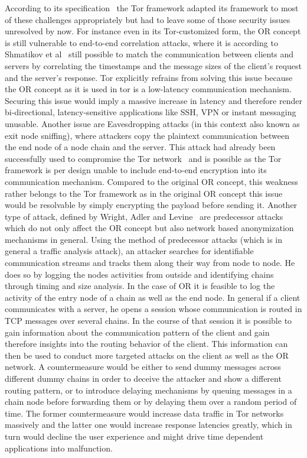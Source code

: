 \documentclass{sig-alternate}
\begin{document}
According to its specification~\cite{torspec} the Tor framework adapted its framework to most of these challenges appropriately but had to leave some of those security issues unresolved by now. For instance even in its Tor-customized form, the OR concept is still vulnerable to end-to-end correlation attacks, where it is according to Shmatikov et al~\cite{shmatikov2006timing} still possible to match the communication between clients and servers by correlating the timestamps and the message sizes of the client's request and the server's response. Tor explicitly refrains from solving this issue because the OR concept as it is used in tor is a low-latency communication mechanism. Securing this issue would imply a massive increase in latency and therefore render bi-directional, latency-sensitive applications like SSH, VPN or instant messaging unusable. Another issue are Eavesdropping attacks (in this context also known as exit node sniffing), where attackers copy the plaintext communication between the end node of a node chain and the server. This attack had already been successfully used to compromise the Tor network~\cite{eavesdrop} and is possible as the Tor framework is per design unable to include end-to-end encryption into its communication mechanism. Compared to the original OR concept, this weakness rather belongs to the Tor framework as in the original OR concept this issue would be resolvable by simply encrypting the payload before sending it. Another type of attack, defined by Wright, Adler and Levine~\cite{wright2004predecessor} are predecessor attacks which do not only affect the OR concept but also network based anonymization mechanisms in general. Using the method of predecessor attacks (which is in general a traffic analysis attack), an attacker searches for identifiable communication streams and tracks them along their way from node to node. He does so by logging the nodes activities from outside and identifying chains through timing and size analysis. In the case of OR it is feasible to log the activity of the entry node of a chain as well as the end node. In general if a client communicates with a server, he opens a session whose communication is routed in TCP messages over several chains. In the course of that session it is possible to gain information about the communication pattern of the client and gain therefore insights into the routing behavior of the client. This information can then be used to conduct more targeted attacks on the client as well as the OR network. A countermeasure would be either to send dummy messages across different dummy chains in order to deceive the attacker and show a different routing pattern, or to introduce delaying mechanisms by queuing messages in a chain node before forwarding them or by delaying them over a random period of time. The former countermeasure would increase data traffic in Tor networks massively and the latter one would increase response latencies greatly, which in turn would decline the user experience and might drive time dependent applications into malfunction. 
\end{document}
